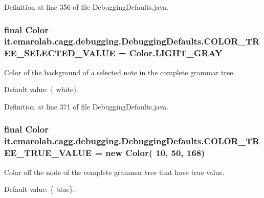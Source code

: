 Definition at line 356 of file Debugging\-Defaults.\-java.

\hypertarget{classit_1_1emarolab_1_1cagg_1_1debugging_1_1DebuggingDefaults_aeaffc96de31394b2b3b1763db2957a04}{
\subsubsection[{C\-O\-L\-O\-R\-\_\-\-T\-R\-E\-E\-\_\-\-S\-E\-L\-E\-C\-T\-E\-D\-\_\-\-V\-A\-L\-U\-E}]{\setlength{\rightskip}{0pt plus 5cm}final Color it.\-emarolab.\-cagg.\-debugging.\-Debugging\-Defaults.\-C\-O\-L\-O\-R\-\_\-\-T\-R\-E\-E\-\_\-\-S\-E\-L\-E\-C\-T\-E\-D\-\_\-\-V\-A\-L\-U\-E = Color.\-L\-I\-G\-H\-T\-\_\-\-G\-R\-A\-Y\hspace{0.3cm}{\ttfamily [static]}}}\label{classit_1_1emarolab_1_1cagg_1_1debugging_1_1DebuggingDefaults_aeaffc96de31394b2b3b1763db2957a04}
Color of the background of a selected note in the complete grammar tree. \par
 Default value\-: \{ white\}. 

Definition at line 371 of file Debugging\-Defaults.\-java.

\hypertarget{classit_1_1emarolab_1_1cagg_1_1debugging_1_1DebuggingDefaults_a2fbef160d6e4e7fc53a1b84a7ea18de0}{
\subsubsection[{C\-O\-L\-O\-R\-\_\-\-T\-R\-E\-E\-\_\-\-T\-R\-U\-E\-\_\-\-V\-A\-L\-U\-E}]{\setlength{\rightskip}{0pt plus 5cm}final Color it.\-emarolab.\-cagg.\-debugging.\-Debugging\-Defaults.\-C\-O\-L\-O\-R\-\_\-\-T\-R\-E\-E\-\_\-\-T\-R\-U\-E\-\_\-\-V\-A\-L\-U\-E = new Color( 10, 50, 168)\hspace{0.3cm}{\ttfamily [static]}}}\label{classit_1_1emarolab_1_1cagg_1_1debugging_1_1DebuggingDefaults_a2fbef160d6e4e7fc53a1b84a7ea18de0}
Color off the node of the complete grammar tree that have true value.\par
 Default value\-: \{ blue\}. 

